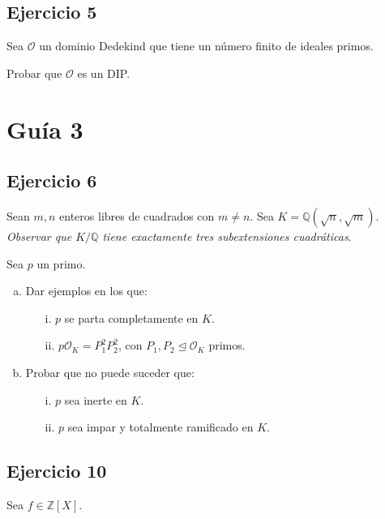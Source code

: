 \documentclass[12pt]{amsart}
\newcommand{\QQ}{\mathbb{Q}}
\newcommand{\ZZ}{\mathbb{Z}}
\newcommand{\OO}{\mathcal{O}}
\theoremstyle{plain}
\begin{document}
\subsection*{Ejercicio 5} Sea $\OO$ un dominio Dedekind que tiene un 
número finito de ideales primos.

Probar que $\OO$ es un DIP.

\section*{Guía 3}

\subsection*{Ejercicio 6} Sean $m,n$ enteros libres de cuadrados con 
$m\neq n$. Sea $K=\QQ(\sqrt{n}, \sqrt{m})$. \textit{Observar que 
$K/\QQ$ tiene exactamente tres subextensiones cuadráticas}.

Sea $p$ un primo.

\begin{enumerate}[a)]
    \item Dar ejemplos en los que:
    \begin{enumerate}
        \item[\textup{i.}] $p$ se parta completamente en $K$.
        \item[\textup{ii.}] $p\OO_K=P_1^2P_2^2$, con $P_1,P_2\unlhd
        \OO_K$ primos.
    \end{enumerate}

    \item Probar que no puede suceder que:
    \begin{enumerate}
        \item[\textup{i.}] $p$ sea inerte en $K$.
        \item[\textup{ii.}] $p$ sea impar y totalmente ramificado en
        $K$.
    \end{enumerate}
\end{enumerate}

\subsection*{Ejercicio 10} Sea $f \in \ZZ[X]$.
\end{document}
